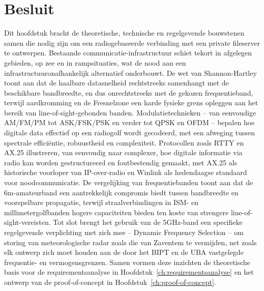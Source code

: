 \section{Besluit}%
\label{sec:stand-van-zaken-besluit}

Dit hoofdstuk bracht de theoretische, technische en regelgevende bouwstenen samen die
nodig zijn om een radiogebaseerde verbinding met een private fileserver te ontwerpen.
Bestaande communicatie-infrastructuur schiet tekort in afgelegen gebieden, op zee en in
rampsituaties, wat de nood aan een infrastructuuronafhankelijk alternatief onderbouwt.
De wet van Shannon-Hartley toont aan dat de haalbare datasnelheid rechtstreeks
samenhangt met de beschikbare bandbreedte, en dus onrechtstreeks met de gekozen
frequentieband, terwijl aardkromming en de Fresnelzone een harde fysieke grens opleggen
aan het bereik van line-of-sight-gebonden banden. Modulatietechnieken -- van eenvoudige
AM/FM/PM tot ASK/FSK/PSK en verder tot QPSK en OFDM -- bepalen hoe digitale data
effectief op een radiogolf wordt gecodeerd, met een afweging tussen spectrale
efficiëntie, robuustheid en complexiteit. Protocollen zoals RTTY en AX.25 illustreren,
van eenvoudig naar complexer, hoe digitale informatie via radio kan worden
gestructureerd en foutbestendig gemaakt, met AX.25 als historische voorloper van
IP-over-radio en Winlink als hedendaagse standaard voor noodcommunicatie. De
vergelijking van frequentiebanden toont aan dat de 6m-amateurband een aantrekkelijk
compromis biedt tussen bandbreedte en voorspelbare propagatie, terwijl straalverbindingen
in ISM- en millimetergolfbanden hogere capaciteiten bieden ten koste van strengere
line-of-sight-vereisten. Tot slot brengt het gebruik van de 5GHz-band een specifieke
regelgevende verplichting met zich mee -- Dynamic Frequency Selection -- om storing van
meteorologische radar zoals die van Zaventem te vermijden, net zoals elk ontwerp zich
moet houden aan de door het BIPT en de UBA vastgelegde frequentie- en
vermogensgrenzen. Samen vormen deze inzichten de theoretische basis voor de
requirementsanalyse in Hoofdstuk~\ref{ch:requirementsanalyse} en het ontwerp van de
proof-of-concept in Hoofdstuk~\ref{ch:proof-of-concept}.


